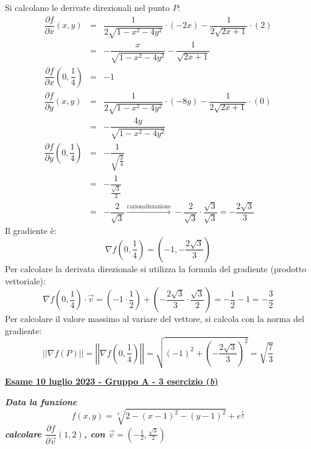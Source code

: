 \documentclass[a4paper]{article}
\newcommand{\definition}[1]{\textcolor{Red3}{\textbf{#1}}}
\newcommand{\example}[1]{\textcolor{Green4}{\textbf{#1}}}
\begin{document}
	\noindent
	Si calcolano le derivate direzionali nel punto $P$:
	\begin{equation*}
		\begin{array}{rcl}
			\dfrac{\partial f}{\partial x}\left(x,y\right) &=& \dfrac{1}{2\sqrt{1-x^{2}-4y^{2}}} \cdot \left(-2x\right) - \dfrac{1}{2\sqrt{2x+1}} \cdot \left(2\right) \\ [1.5em]
			&=& -\dfrac{x}{\sqrt{1-x^{2}-4y^{2}}} - \dfrac{1}{\sqrt{2x+1}} \\ [1em]
			\dfrac{\partial f}{\partial x}\left(0,\dfrac{1}{4}\right) &=& -1 \\ [2em]
			\dfrac{\partial f}{\partial y}\left(x,y\right) &=& \dfrac{1}{2\sqrt{1-x^{2}-4y^{2}}} \cdot \left(-8y\right) - \dfrac{1}{2\sqrt{2x+1}} \cdot \left(0\right) \\ [1.5em]
			&=& -\dfrac{4y}{\sqrt{1-x^{2}-4y^{2}}} \\ [1em]
			\dfrac{\partial f}{\partial y}\left(0,\dfrac{1}{4}\right) &=& -\dfrac{1}{\sqrt{\frac{3}{4}}} \\ [2.5em]
			&=& - \dfrac{1}{\frac{\sqrt{3}}{2}} \\ [2em]
			&=& - \dfrac{2}{\sqrt{3}} \xrightarrow{\text{razionalizzazione}} - \dfrac{2}{\sqrt{3}} \cdot \dfrac{\sqrt{3}}{\sqrt{3}}  = -\dfrac{2\sqrt{3}}{3}
		\end{array}
	\end{equation*}
	Il gradiente è:
	\begin{equation*}
		\nabla f\left(0,\dfrac{1}{4}\right) = \left(-1, -\dfrac{2\sqrt{3}}{3}\right)
	\end{equation*}
	Per calcolare la derivata direzionale si utilizza la formula del gradiente (prodotto vettoriale):
	\begin{equation*}
		\nabla f\left(0,\dfrac{1}{4}\right) \cdot \overrightarrow{v} = \left(-1 \cdot \dfrac{1}{2}\right) + \left(-\dfrac{2\sqrt{3}}{3} \cdot \dfrac{\sqrt{3}}{2}\right) = -\dfrac{1}{2} - 1 = -\dfrac{3}{2}
	\end{equation*}
	Per calcolare il valore massimo al variare del vettore, si calcola con la norma del gradiente:
	\begin{equation*}
		\left|\left| \nabla f\left(P\right) \right|\right| = \left|\left| \nabla f\left(0,\dfrac{1}{4}\right) \right|\right| = \sqrt{\left(-1\right)^{2} + \left(-\dfrac{2\sqrt{3}}{3}\right)^{2}} = \sqrt{\dfrac{7}{3}}
	\end{equation*}\newpage

	\begin{flushleft}
		\label{exam: esame 10 luglio 2023 - Gruppo A - 3 esercizio (b)}
		\hypertarget{
			exam: esame 10 luglio 2023 - Gruppo A - 3 esercizio (b)
		}{
			\definition{\underline{Esame 10 luglio 2023 - Gruppo A - 3 esercizio (\emph{b})}}
		}
	\end{flushleft}
	\example{\emph{Data la funzione}
	\begin{equation*}
		f\left(x,y\right) = \sqrt[4]{2-\left(x-1\right)^{2}-\left(y-1\right)^{2}} + e^{\frac{1}{x}}
	\end{equation*}
	\emph{calcolare $\dfrac{\partial f}{\partial \overrightarrow{v}}\left(1,2\right)$, con $\overrightarrow{v} = \left(-\frac{1}{2}, \frac{\sqrt{3}}{2}\right)$}}\newline
\end{document}
